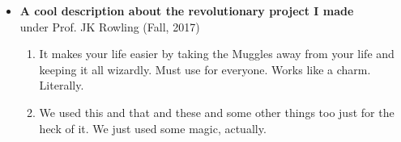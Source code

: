 \begin{itemize}

\item
    {\bf A cool description about the revolutionary project I made}
    \\ under Prof. JK Rowling \hfill (Fall, 2017)
    \begin{enumerate}
        \item It makes your life easier by taking the Muggles away from your life and keeping it all wizardly. Must use for everyone. Works like a charm. Literally.
        \item We used this and that and these and some other things too just for the heck of it. We just used some magic, actually.
    \end{enumerate}

\end{itemize}

